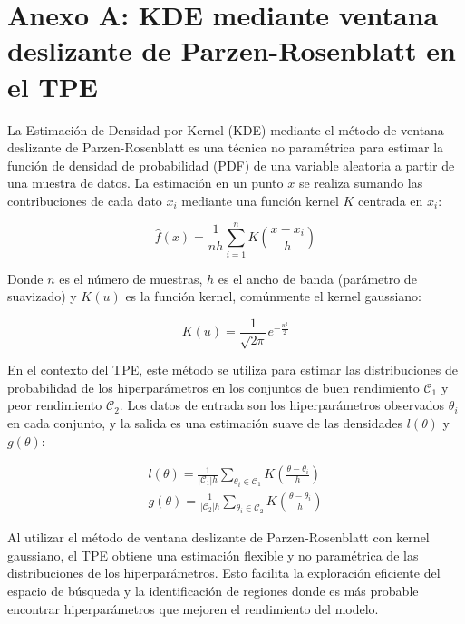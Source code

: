 \section{Anexo A: KDE mediante ventana deslizante de Parzen-Rosenblatt en el TPE}

\label{sec:anexo_a}

La Estimación de Densidad por Kernel (KDE) mediante el método de ventana deslizante de Parzen-Rosenblatt es una técnica no paramétrica para estimar la función de densidad de probabilidad (PDF) de una variable aleatoria a partir de una muestra de datos. La estimación en un punto \( x \) se realiza sumando las contribuciones de cada dato \( x_i \) mediante una función kernel \( K \) centrada en \( x_i \):

\begin{equation}
	\hat{f}(x) = \frac{1}{n h} \sum_{i=1}^{n} K\left( \frac{x - x_i}{h} \right)
\end{equation}


Donde \( n \) es el número de muestras, \( h \) es el ancho de banda (parámetro de suavizado) y \( K(u) \) es la función kernel, comúnmente el kernel gaussiano:

\begin{equation}
	K(u) = \frac{1}{\sqrt{2\pi}} e^{- \frac{u^2}{2}}
\end{equation}


En el contexto del TPE, este método se utiliza para estimar las distribuciones de probabilidad de los hiperparámetros en los conjuntos de buen rendimiento \( \mathcal{C}_1 \) y peor rendimiento \( \mathcal{C}_2 \). Los datos de entrada son los hiperparámetros observados \( \theta_i \) en cada conjunto, y la salida es una estimación suave de las densidades \( l(\theta) \) y \( g(\theta) \):


\begin{equation}
	\begin{aligned}
		l(\theta) = \frac{1}{|\mathcal{C}_1| h} \sum_{\theta_i \in \mathcal{C}_1} K\left( \frac{\theta - \theta_i}{h} \right) \\
		g(\theta) = \frac{1}{|\mathcal{C}_2| h} \sum_{\theta_i \in \mathcal{C}_2} K\left( \frac{\theta - \theta_i}{h} \right)
	\end{aligned}
\end{equation}

Al utilizar el método de ventana deslizante de Parzen-Rosenblatt con kernel gaussiano, el TPE obtiene una estimación flexible y no paramétrica de las distribuciones de los hiperparámetros. Esto facilita la exploración eficiente del espacio de búsqueda y la identificación de regiones donde es más probable encontrar hiperparámetros que mejoren el rendimiento del modelo.


